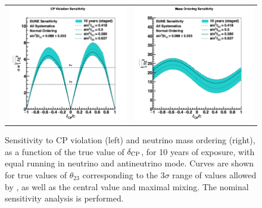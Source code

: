 \begin{figure}[h!]
    \centering
    \begin{tabular}{cc}
		\includegraphics[width=0.475\linewidth]{graphics/cpv_varyth23_2019_v4.png} &
		\includegraphics[width=0.475\linewidth]{graphics/mh_varyth23_2019_v4.png}
	\end{tabular}
	\caption[Sensitivity to CP violation and neutrino mass ordering, as a function of $\deltacp$]{Sensitivity to CP violation (left) and neutrino mass ordering (right), as a function of the true value of $\deltacp$, for 10 years of exposure, with equal running in neutrino and antineutrino mode. Curves are shown for true values of $\theta_{23}$ corresponding to the 3$\sigma$ range of values allowed by , as well as the  central value and maximal mixing. The nominal sensitivity analysis is performed.}
    \label{fig:th23var}
\end{figure}

